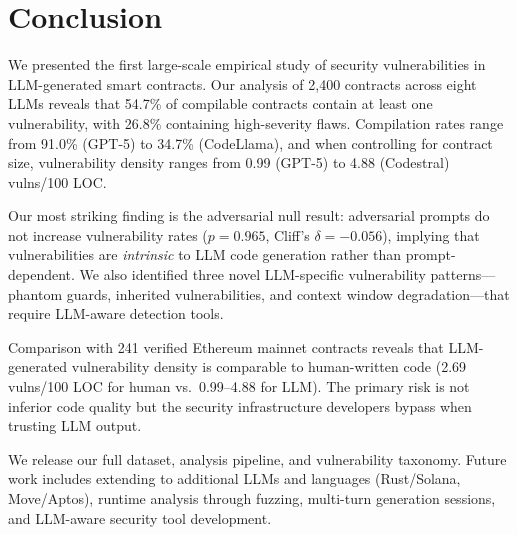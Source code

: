 \section{Conclusion}
\label{sec:conclusion}

We presented the first large-scale empirical study of security vulnerabilities in LLM-generated smart contracts. Our analysis of 2,400 contracts across eight LLMs reveals that 54.7\% of compilable contracts contain at least one vulnerability, with 26.8\% containing high-severity flaws. Compilation rates range from 91.0\% (GPT-5) to 34.7\% (CodeLlama), and when controlling for contract size, vulnerability density ranges from 0.99 (GPT-5) to 4.88 (Codestral) vulns/100 LOC.

Our most striking finding is the adversarial null result: adversarial prompts do not increase vulnerability rates ($p = 0.965$, Cliff's $\delta = -0.056$), implying that vulnerabilities are \emph{intrinsic} to LLM code generation rather than prompt-dependent. We also identified three novel LLM-specific vulnerability patterns---phantom guards, inherited vulnerabilities, and context window degradation---that require LLM-aware detection tools.

Comparison with 241 verified Ethereum mainnet contracts reveals that LLM-generated vulnerability density is comparable to human-written code (2.69 vulns/100 LOC for human vs.\ 0.99--4.88 for LLM). The primary risk is not inferior code quality but the security infrastructure developers bypass when trusting LLM output.

We release our full dataset, analysis pipeline, and vulnerability taxonomy. Future work includes extending to additional LLMs and languages (Rust/Solana, Move/Aptos), runtime analysis through fuzzing, multi-turn generation sessions, and LLM-aware security tool development.
